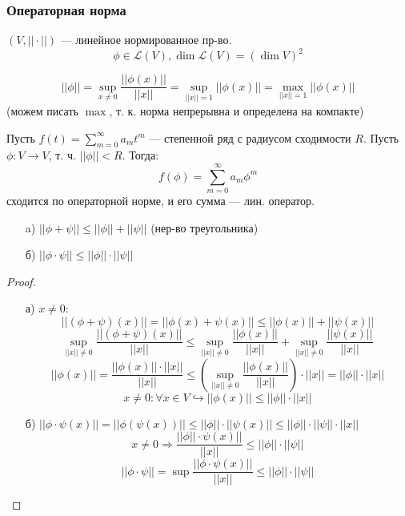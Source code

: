\subsubsection{Операторная норма}
$(V, ||\cdot||)$ --- линейное нормированное пр-во.
\[
    \phi \in \mathcal{L}(V), \dim \mathcal{L}(V) = (\dim V)^{2}
\]
\begin{definition}
    \[
    ||\phi|| = \underset{x \neq 0}{\sup} \frac{||\phi(x)||}{||x||} = \underset{||x|| = 1}{\sup} ||\phi(x)|| = \underset{||x|| = 1}{\max} ||\phi(x)||
    \]
    (можем писать $\max$, т. к. норма непрерывна и определена на компакте)
\end{definition}
\begin{theorem}
\label{theorem:07_2}
    Пусть $f(t) = \sum_{m = 0}^{\infty} a_m t^{m}$ --- степенной ряд с радиусом сходимости $R$. Пусть $\phi \colon V \rightarrow V$, т. ч. $||\phi|| < R$. Тогда:
    \[
    f(\phi) = \sum_{m = 0}^{\infty} a_m \phi^{m} 
    \]
сходится по операторной норме, и его сумма --- лин. оператор.
\end{theorem}
\begin{lemma}
    \label{lemma:07_1}
    \begin{itemize}
        \item [a) ] $||\phi + \psi|| \leq ||\phi|| + ||\psi||$ (нер-во треугольника)
        \item [б) ] $||\phi \cdot \psi|| \leq ||\phi||\cdot||\psi||$
    \end{itemize}
\end{lemma}
\begin{proof}
    \begin{itemize}
        \item [а) ] $x \neq 0$:
            \[
            ||(\phi + \psi)(x)|| = ||\phi(x) + \psi(x)|| \leq ||\phi(x)|| + ||\psi(x)||
            \]
            \[
        \underset{||x||\neq 0}{\sup} \frac{||(\phi + \psi)(x)||}{||x||} \leq \underset{||x|| \neq 0}{\sup} \frac{||\phi(x)||}{||x||} + \underset{||x|| \neq 0}{\sup} \frac{||\psi(x)||}{||x||}
            \]
         \[
            ||\phi(x)|| = \frac{||\phi(x)|| \cdot ||x||}{||x||} \leq \left(\underset{||x|| \neq 0}{\sup} \frac{||\phi(x)||}{||x||}\right) \cdot ||x|| = ||\phi|| \cdot ||x||
        \]
        \[
        x \neq 0 \colon \forall x \in V \hookrightarrow ||\phi(x)|| \leq ||\phi|| \cdot ||x||
        \]
\item [б) ] $||\phi \cdot \psi(x)|| = ||\phi(\psi(x))|| \leq ||\phi|| \cdot ||\psi(x)|| \leq ||\phi|| \cdot ||\psi|| \cdot ||x||$
    \[
    x \neq 0 \Rightarrow \frac{||\phi|| \cdot \psi(x)||}{||x||} \leq ||\phi|| \cdot ||\psi||
    \]
    \[
    ||\phi \cdot \psi || = \sup \frac{||\phi \cdot \psi(x)||}{||x||} \leq ||\phi|| \cdot ||\psi||
    \]
    \end{itemize}
\end{proof}
